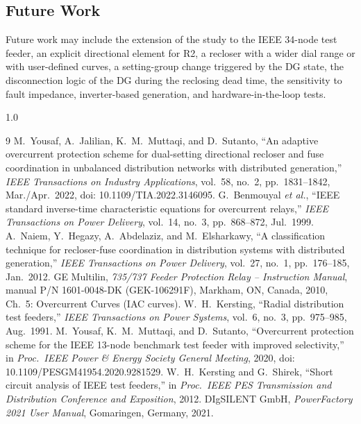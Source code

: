 \documentclass[12pt,a4paper]{article}
\begin{document}
\subsection{Future Work}
Future work may include the extension of the study to the IEEE 34-node test feeder, an explicit directional
element for R2, a recloser with a
wider dial range or with user-defined curves, a setting-group
change triggered by the DG state, the disconnection logic of the DG during the reclosing dead time, the
sensitivity to fault impedance, inverter-based generation, and hardware-in-the-loop tests.

\clearpage
{}
\begin{spacing}{1.0}
\begin{thebibliography}{9}
\setlength{\itemsep}{10pt}
 M.~Yousaf, A.~Jalilian, K.~M.~Muttaqi, and D.~Sutanto, ``An adaptive overcurrent
protection scheme for dual-setting directional recloser and fuse coordination in unbalanced distribution
networks with distributed generation,'' \textit{IEEE Transactions on Industry Applications}, vol.~58, no.~2,
pp.~1831--1842, Mar./Apr.\ 2022, doi: 10.1109/TIA.2022.3146095.
 G.~Benmouyal \textit{et al.}, ``IEEE standard inverse-time characteristic equations
for overcurrent relays,'' \textit{IEEE Transactions on Power Delivery}, vol.~14, no.~3, pp.~868--872,
Jul.\ 1999.
 A.~Naiem, Y.~Hegazy, A.~Abdelaziz, and M.~Elsharkawy, ``A classification technique for
recloser-fuse coordination in distribution systems with distributed generation,'' \textit{IEEE Transactions
on Power Delivery}, vol.~27, no.~1, pp.~176--185, Jan.\ 2012.
 GE Multilin, \textit{735/737 Feeder Protection Relay -- Instruction Manual}, manual
P/N 1601-0048-DK (GEK-106291F), Markham, ON, Canada, 2010, Ch.~5: Overcurrent Curves (IAC curves).
 W.~H.~Kersting, ``Radial distribution test feeders,'' \textit{IEEE Transactions on
Power Systems}, vol.~6, no.~3, pp.~975--985, Aug.\ 1991.
 M.~Yousaf, K.~M.~Muttaqi, and D.~Sutanto, ``Overcurrent protection scheme for the IEEE
13-node benchmark test feeder with improved selectivity,'' in \textit{Proc.\ IEEE Power \& Energy Society
General Meeting}, 2020, doi: 10.1109/PESGM41954.2020.9281529.
 W.~H.~Kersting and G.~Shirek, ``Short circuit analysis of IEEE test feeders,'' in
\textit{Proc.\ IEEE PES Transmission and Distribution Conference and Exposition}, 2012.
 DIgSILENT GmbH, \textit{PowerFactory 2021 User Manual}, Gomaringen, Germany, 2021.
\end{thebibliography}
\end{spacing}
\end{document}
